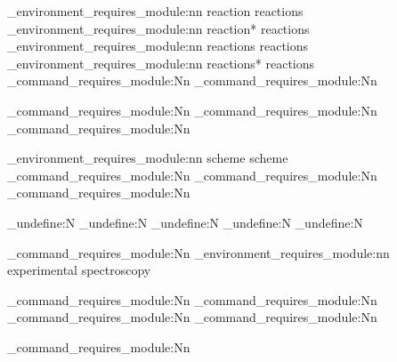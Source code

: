 \chemmacros_environment_requires_module:nn {reaction}       {reactions}
\chemmacros_environment_requires_module:nn {reaction*}      {reactions}
\chemmacros_environment_requires_module:nn {reactions}      {reactions}
\chemmacros_environment_requires_module:nn {reactions*}     {reactions}
\chemmacros_command_requires_module:Nn     
\chemmacros_command_requires_module:Nn     

\chemmacros_command_requires_module:Nn 
\chemmacros_command_requires_module:Nn 
\chemmacros_command_requires_module:Nn 

\chemmacros_environment_requires_module:nn {scheme}        {scheme}
\chemmacros_command_requires_module:Nn     
\chemmacros_command_requires_module:Nn     
\chemmacros_command_requires_module:Nn     

  {
    \cs_undefine:N \scheme
    \cs_undefine:N \endscheme
    \cs_undefine:N \listschemename
    \cs_undefine:N \schemename
    \cs_undefine:N \listofschemes
  }

\chemmacros_command_requires_module:Nn     
\chemmacros_environment_requires_module:nn {experimental} {spectroscopy}

\chemmacros_command_requires_module:Nn 
\chemmacros_command_requires_module:Nn 
\chemmacros_command_requires_module:Nn 
\chemmacros_command_requires_module:Nn 

\chemmacros_command_requires_module:Nn 


\ChemModuleEnd
